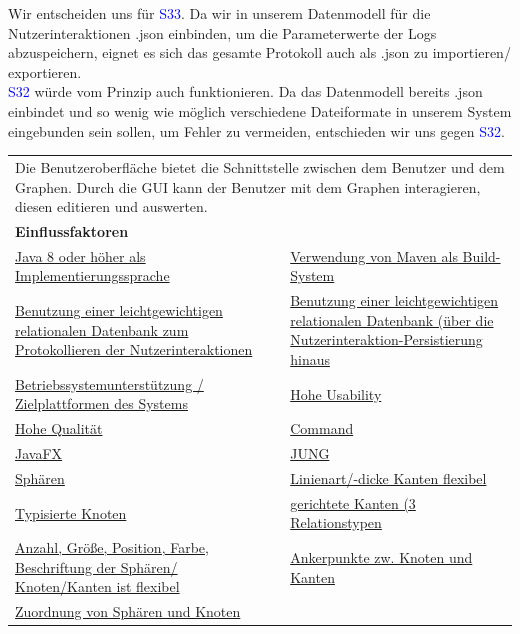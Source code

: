 \documentclass[enabledeprecatedfontcommands,fontsize=11pt,paper=a4,twoside]{scrartcl}
\newcounter{one}
\newcommand{\cb}[1]{{\textcolor{blue}{#1}}}
\begin{document}
\begin{onehalfspace}
	Wir entscheiden uns für \cb{S33}. Da wir in unserem Datenmodell für die Nutzerinteraktionen .json einbinden, um die Parameterwerte der Logs abzuspeichern, eignet es sich das gesamte Protokoll auch als .json zu importieren/ exportieren. \\
	\cb{S32} würde vom Prinzip auch funktionieren. Da das Datenmodell bereits .json einbindet und so wenig wie möglich verschiedene Dateiformate in unserem System eingebunden sein sollen, um Fehler zu vermeiden, entschieden wir uns gegen \cb{S32}.
\end{onehalfspace}
\newpage
\begin{tabular} {|p{8cm} p{8cm}|}
	\hline
	\rowcolor{prob}\multicolumn{2}{|l|}{\parbox{16cm}{\textbf{13: Benutzeroberfläche}}} \\  \hline\hline 
	\multicolumn{2}{|l|}{\parbox{16cm}{Die Benutzeroberfläche bietet die Schnittstelle zwischen dem Benutzer und dem Graphen. Durch die GUI kann der Benutzer mit dem Graphen interagieren, diesen editieren und auswerten.}}\rule{0pt}{4ex}\\ [1ex] \hline
	\multicolumn{2}{|l|}{\textbf{Einflussfaktoren}}\\
	\hyperlink{b}{Java 8 oder höher als Implementierungssprache} &
	\hyperlink {c}{Verwendung von Maven als Build-System} \\
	\hyperlink {d}{Benutzung einer leichtgewichtigen relationalen Datenbank zum Protokollieren der Nutzerinteraktionen}&
	\hyperlink {e}{Benutzung einer leichtgewichtigen relationalen Datenbank (über die Nutzerinteraktion-Persistierung hinaus}\\
	\hyperlink {f}{Betriebssystemunterstützung / Zielplattformen des Systems}&
	\hyperlink {g}{Hohe Usability}\\
	\hyperlink {h}{Hohe Qualität}&
	\hyperlink {i}{Command} \\
	\hyperlink {j}{JavaFX}&
	\hyperlink {k}{JUNG} \\
	\hyperlink {n}{Sphären} &
	\hyperlink {o}{Linienart/-dicke Kanten flexibel}\\
	\hyperlink {p}{Typisierte Knoten} &
	\hyperlink {q}{gerichtete Kanten (3 Relationstypen} \\
	\hyperlink {r}{Anzahl, Größe, Position, Farbe, Beschriftung der Sphären/ Knoten/Kanten ist flexibel} &
	\hyperlink {s}{Ankerpunkte zw. Knoten und Kanten} \\
	\hyperlink {t}{Zuordnung von Sphären und Knoten} &

\end{tabular}
\end{document}

